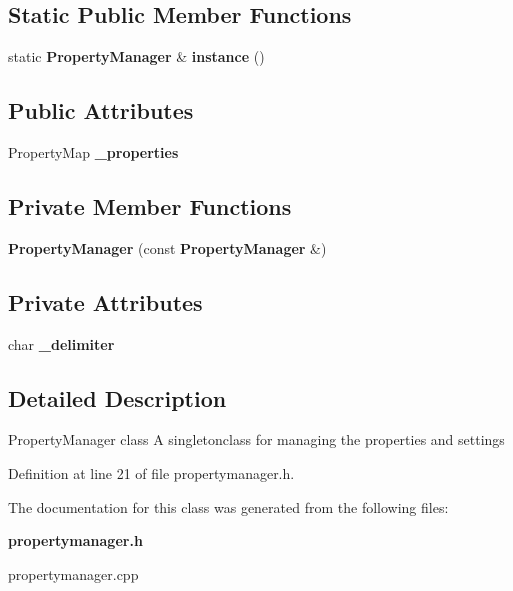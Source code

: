 \subsection*{Static Public Member Functions}
\begin{DoxyCompactItemize}
\item 
static {\bf Property\-Manager} \& {\bfseries instance} ()\label{classSoundfieldViewer_1_1PropertyManager_a656e6beb866ef0e40a492df674a890db}

\end{DoxyCompactItemize}
\subsection*{Public Attributes}
\begin{DoxyCompactItemize}
\item 
Property\-Map {\bfseries \-\_\-properties}\label{classSoundfieldViewer_1_1PropertyManager_aed36f0fb1002e670a8f1ef4babaa6647}

\end{DoxyCompactItemize}
\subsection*{Private Member Functions}
\begin{DoxyCompactItemize}
\item 
{\bfseries Property\-Manager} (const {\bf Property\-Manager} \&)\label{classSoundfieldViewer_1_1PropertyManager_ad01a331d1c7f9db357b2ab46f7199885}

\end{DoxyCompactItemize}
\subsection*{Private Attributes}
\begin{DoxyCompactItemize}
\item 
char {\bfseries \-\_\-delimiter}\label{classSoundfieldViewer_1_1PropertyManager_a191e16057c951e2c22486b318d97b91f}

\end{DoxyCompactItemize}


\subsection{Detailed Description}
Property\-Manager class A singletonclass for managing the properties and settings 

Definition at line 21 of file propertymanager.\-h.



The documentation for this class was generated from the following files\-:\begin{DoxyCompactItemize}
\item 
{\bf propertymanager.\-h}\item 
propertymanager.\-cpp\end{DoxyCompactItemize}
